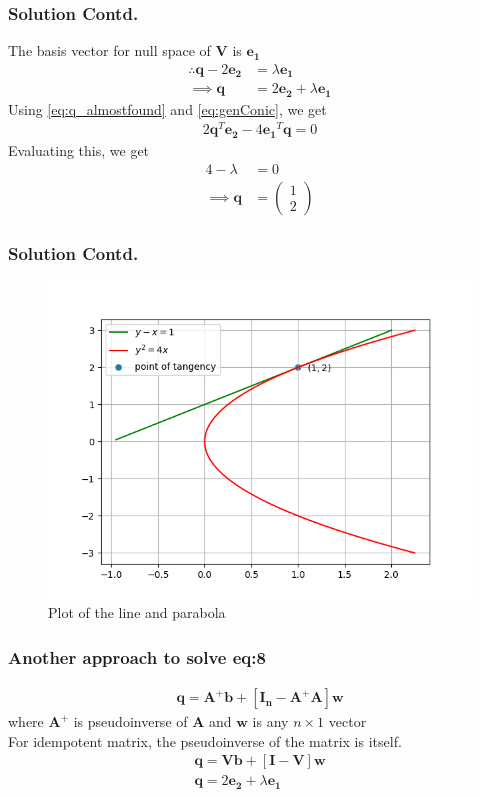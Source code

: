\documentclass{beamer}
\newcommand{\myvec}[1]{\ensuremath{\begin{pmatrix}#1\end{pmatrix}}}
\renewcommand{\vec}[1]{\boldsymbol{#1}}
\begin{document}
\begin{frame}
    \frametitle{Solution Contd.}
    The basis vector for null space of $\vec{V}$ is $\vec{e_1}$
\begin{align}
    \therefore \vec{q}-2\vec{e_2}&=\lambda\vec{e_1} \\
    \implies \vec{q}&=2\vec{e_2}+\lambda\vec{e_1} \label{eq:q_almostfound}
\end{align}
Using \eqref{eq:q_almostfound} and \eqref{eq:genConic}, we get
\begin{align}
    2\vec{q}^T\vec{e_2}-4\vec{e_1}^T\vec{q}=0
\end{align}
Evaluating this, we get
\begin{align}
    4-\lambda&=0 \\
    \implies \vec{q}&=\myvec{1\\2}
\end{align}
\end{frame}

    

\begin{frame}
\frametitle{Solution Contd.}
\begin{figure}[!h]
    \centering
    \includegraphics[width=0.8\columnwidth]{plot/figure_1}
    \caption{Plot of the line and parabola}
    \label{plot}
\end{figure}
\end{frame}

\begin{frame}
\frametitle{Another approach to solve eq:8}
\begin{align}
    \vec{q}=\vec{A^+b+[I_n-A^+A]w}
\end{align}
where $\vec{A^+}$ is pseudoinverse of $\vec{A}$ and $\vec{w}$ is any $n\times 1$ vector\\
For idempotent matrix, the pseudoinverse of the matrix is itself.
\begin{align}
    \vec{q}=\vec{Vb}+[\vec{I-V}]\vec{w} \\
    \vec{q}=2\vec{e_2}+\lambda\vec{e_1}
\end{align}
\end{frame}
\end{document}

